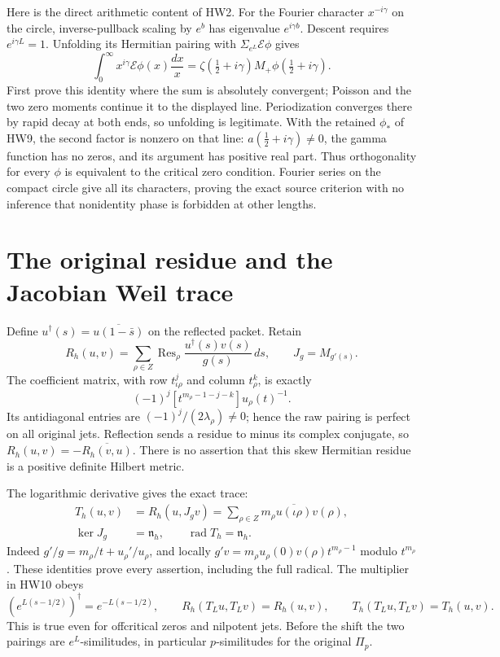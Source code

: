\documentclass[11pt,a4paper]{article}
\theoremstyle{definition}\newtheorem{definition}[theorem]{Definition}
\providecommand{\Res}{\operatorname{Res}}
\begin{document}
Here is the direct arithmetic content of HW2. For the Fourier
character \(x^{-i\gamma}\) on the circle, inverse-pullback
scaling by \(e^b\) has eigenvalue \(e^{i\gamma b}\).
Descent requires \(e^{i\gamma L}=1\).
Unfolding its Hermitian pairing with
\(\Sigma_{e^L}\mathcal E\phi\) gives
\[
 \int_0^\infty x^{i\gamma}\mathcal E\phi(x)\frac{dx}{x}
   =\zeta(\tfrac12+i\gamma)
      M_+\phi(\tfrac12+i\gamma).
 \tag{HW18}
\]
First prove this identity where the sum is absolutely convergent;
Poisson and the two zero moments continue it to the displayed
line. Periodization converges there by rapid decay at both
ends, so unfolding is legitimate. With the retained
\(\phi_*\) of HW9, the second factor is nonzero on that line:
\(a(\tfrac12+i\gamma)\ne0\), the gamma function has no zeros,
and its argument has positive real part. Thus orthogonality
for every \(\phi\) is equivalent to the critical zero condition.
Fourier series on the compact circle give all its characters,
proving the exact source criterion with no inference that
nonidentity phase is forbidden at other lengths.

\section{The original residue and the Jacobian Weil trace}

Define \(u^\dagger(s)=\overline{u(1-\bar s)}\) on the
reflected packet. Retain
\[
 R_h(u,v)=\sum_{\rho\in Z}\Res_\rho
          \frac{u^\dagger(s)v(s)}{g(s)}\,ds,\qquad
 J_g=M_{g'(s)}.
 \tag{HW19}
\]
The coefficient matrix, with row \(t_{\iota\rho}^j\) and
column \(t_\rho^k\), is exactly
\[
 (-1)^j[t^{m_\rho-1-j-k}]u_\rho(t)^{-1}.
 \tag{HW20}
\]
Its antidiagonal entries are
\((-1)^j/(2\lambda_\rho)\ne0\); hence the raw pairing is
perfect on all original jets. Reflection sends a residue to
minus its complex conjugate, so
\(R_h(u,v)=-\overline{R_h(v,u)}\).
There is no assertion that this skew Hermitian residue is a
positive definite Hilbert metric.

The logarithmic derivative gives the exact trace:
\[
 \begin{split}
 T_h(u,v)&=R_h(u,J_gv)
       =\sum_{\rho\in Z}m_\rho
                      \overline{u(\iota\rho)}v(\rho),\\
 \ker J_g&=\mathfrak n_h,\qquad
 \operatorname{rad}T_h=\mathfrak n_h .
 \end{split}
 \tag{HW21}\label{hw:weilpacket}
\]
Indeed \(g'/g=m_\rho/t+u_\rho'/u_\rho\), and locally
\(g'v=m_\rho u_\rho(0)v(\rho)t^{m_\rho-1}\) modulo
\(t^{m_\rho}\). These identities prove every assertion,
including the full radical.
The multiplier in HW10 obeys
\[
 (e^{L(s-1/2)})^\dagger=e^{-L(s-1/2)},\qquad
 R_h(T_Lu,T_Lv)=R_h(u,v),\qquad
 T_h(T_Lu,T_Lv)=T_h(u,v).
 \tag{HW22}\label{hw:isometry}
\]
This is true even for offcritical zeros and nilpotent jets.
Before the shift the two pairings are \(e^L\)-similitudes,
in particular \(p\)-similitudes for the original \(\Pi_p\).
\end{document}
